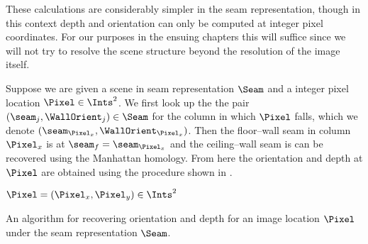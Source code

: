 These calculations are considerably simpler in the seam
representation, though in this context depth and orientation can only
be computed at integer pixel coordinates. For our purposes in the
ensuing chapters this will suffice since we will not try to resolve
the scene structure beyond the resolution of the image itself.

Suppose we are given a scene in seam representation $\Seam$ and a
integer pixel location $\Pixel\in\Ints^2$. We first look up the the
pair $(\seam_j,\WallOrient_j)\in\Seam$ for the column in which $\Pixel$
falls, which we denote $(\seam_{\Pixel_x},\WallOrient_{\Pixel_x})$. Then
the floor--wall seam in column $\Pixel_x$ is at
$\seam_f=\seam_{\Pixel_x}$ and the ceiling--wall seam is can be
recovered using the Manhattan homology. From here the orientation and depth at
$\Pixel$ are obtained using the procedure shown in
.

\begin{algorithm}[tb]
  \label{alg:seam-depth-orient}
        \begin{algorithmic}
          \REQUIRE $\Pixel=(\Pixel_x,\Pixel_y)\in\Ints^2$
          \STATE{}
          \ELSE
          \ENDIF
        \end{algorithmic}
  \caption{An algorithm for recovering orientation and depth for an
    image location $\Pixel$ under the seam representation $\Seam$.}
\end{algorithm}

